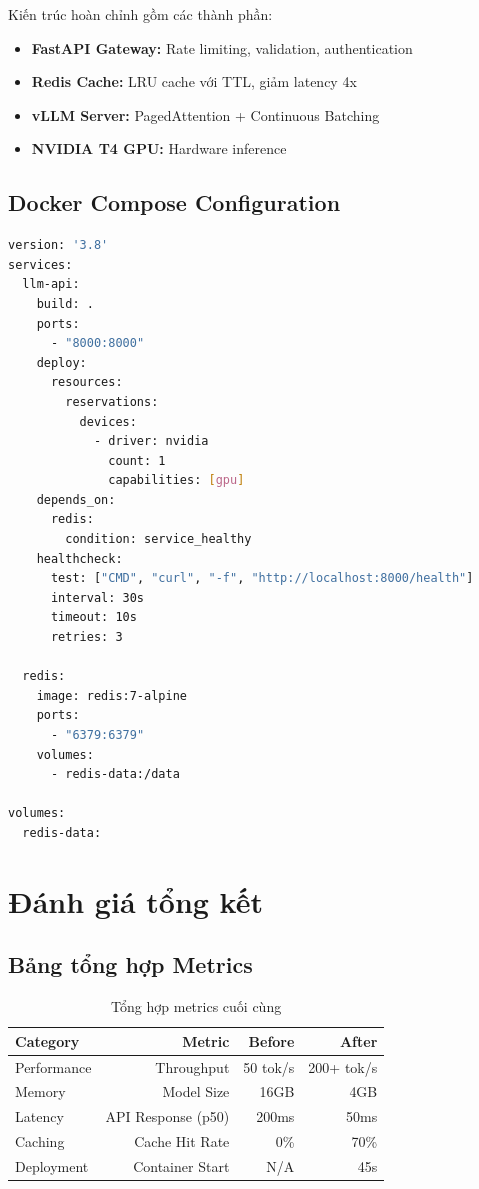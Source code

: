 \documentclass[12pt,a4paper]{report}
\begin{document}
Kiến trúc hoàn chỉnh gồm các thành phần:
\begin{itemize}
  \item \textbf{FastAPI Gateway:} Rate limiting, validation, authentication
  \item \textbf{Redis Cache:} LRU cache với TTL, giảm latency 4x
  \item \textbf{vLLM Server:} PagedAttention + Continuous Batching
  \item \textbf{NVIDIA T4 GPU:} Hardware inference
\end{itemize}

\subsection{Docker Compose Configuration}

\begin{lstlisting}[language=bash,caption={Docker Compose}]
version: '3.8'
services:
  llm-api:
    build: .
    ports:
      - "8000:8000"
    deploy:
      resources:
        reservations:
          devices:
            - driver: nvidia
              count: 1
              capabilities: [gpu]
    depends_on:
      redis:
        condition: service_healthy
    healthcheck:
      test: ["CMD", "curl", "-f", "http://localhost:8000/health"]
      interval: 30s
      timeout: 10s
      retries: 3

  redis:
    image: redis:7-alpine
    ports:
      - "6379:6379"
    volumes:
      - redis-data:/data

volumes:
  redis-data:
\end{lstlisting}

\section{Đánh giá tổng kết}

\subsection{Bảng tổng hợp Metrics}

\begin{table}[h]
\centering
\caption{Tổng hợp metrics cuối cùng}
\label{tab:final-metrics}
\begin{tabular}{lrrr}
\toprule
\textbf{Category} & \textbf{Metric} & \textbf{Before} & \textbf{After} \\
\midrule
Performance & Throughput & 50 tok/s & 200+ tok/s \\
Memory & Model Size & 16GB & 4GB \\
Latency & API Response (p50) & 200ms & 50ms \\
Caching & Cache Hit Rate & 0\% & 70\% \\
Deployment & Container Start & N/A & 45s \\
\bottomrule
\end{tabular}
\end{table}
\end{document}
